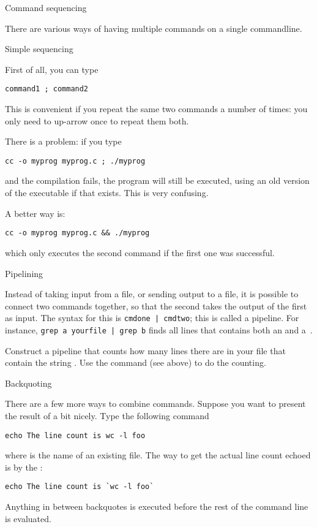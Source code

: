  {Command sequencing}
\label{tut:unix-bq}

There are various ways of having multiple commands on a single
commandline.

 {Simple sequencing}

First of all, you can type
\begin{lstlisting}
command1 ; command2
\end{lstlisting}
This is convenient if you repeat the same two commands a number of
times: you only need to up-arrow once to repeat them both.

There is a problem: if you type
\begin{lstlisting}
cc -o myprog myprog.c ; ./myprog
\end{lstlisting}
and the compilation fails, the program will still be executed,
using an old version of the executable if that exists. This is very
confusing.

A better way is:
\begin{lstlisting}
cc -o myprog myprog.c && ./myprog
\end{lstlisting}
which only executes the second command if the first one was
successful.

 {Pipelining}

Instead of taking input from a file, or sending output to a file, it
is possible to connect two commands together, so that the second takes
the output of the first as input. The syntax for this is
\verb+cmdone | cmdtwo+; this is called a pipeline. For instance,
\verb+grep a yourfile | grep b+ finds all lines that contains both an
 and a~.

\begin{exercise}
  Construct a pipeline that counts how many lines there are in your
  file that contain the string . Use the  command (see
  above) to do the counting.
\end{exercise}

 {Backquoting}
\label{tut:unix-backquote}

There are a few more ways to combine commands. Suppose you want to
present the result of  a bit nicely. Type the following command
\begin{lstlisting}
echo The line count is wc -l foo
\end{lstlisting}
where  is the name of an existing file. The way to
get the actual line count echoed is by the :
\begin{lstlisting}
echo The line count is `wc -l foo`
\end{lstlisting}
Anything in between backquotes is executed before the rest of the
command line is evaluated.

